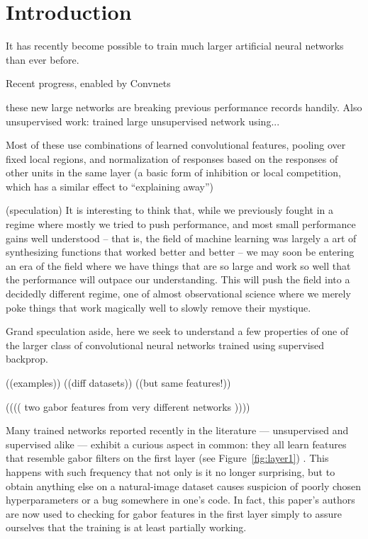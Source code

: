 
\section{Introduction}

It has recently become possible to train much larger artificial neural networks than ever before. 


Recent progress, enabled by Convnets \cite{LeCun89}

these new large networks are breaking previous performance records handily. Also unsupervised work: \cite{Le-2011-ICA} trained large unsupervised network using...

Most of these use combinations of learned convolutional features, pooling over fixed local regions, and normalization of responses based on the responses of other units in the same layer (a basic form of inhibition or local competition, which has a similar effect to ``explaining away'')

(speculation) It is interesting to think that, while we previously fought in a regime where mostly we tried to push performance, and most small performance gains well understood -- that is, the field of machine learning was largely a art of synthesizing functions that worked better and better -- we may soon be entering an era of the field where we have things that are so large and work so well that the performance will outpace our understanding. This will push the  field into a decidedly different regime, one of almost observational science where we merely poke things that work magically well to slowly remove their mystique.

Grand speculation aside, here we seek to understand a few properties of one of the larger class of convolutional neural networks trained using supervised backprop.

((examples))
((diff datasets))
((but same features!))

(((( two gabor features from very different networks ))))


Many trained networks reported recently in the literature --- unsupervised and supervised alike --- exhibit a curious aspect in common: they all learn features that resemble gabor filters on the first layer (see Figure~\ref{fig:layer1}) . This happens with such frequency that not only is it no longer surprising, but to obtain anything else on a natural-image dataset causes suspicion of poorly chosen hyperparameters or a bug somewhere in one's code. In fact, this paper's authors are now used to checking for gabor features in the first layer simply to assure ourselves that the training is at least partially working.

